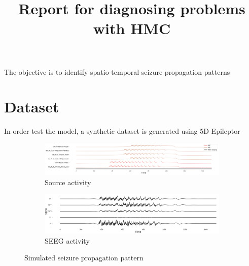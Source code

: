 \documentclass[12pt]{article}
\title{Report for diagnosing problems with HMC}
\begin{document}
\begin{titlepage}
  \maketitle
\end{titlepage}
The objective is to identify spatio-temporal seizure propagation patterns
\section*{Dataset}
In order test the model, a synthetic dataset is generated using 5D Epileptor
\begin{figure}[h!]
  \centering
  \begin{subfigure}{\linewidth}
    \includegraphics[width=\textwidth]{figures/source_activity_syn_data.png}
    \caption{Source activity}
  \end{subfigure}
  \begin{subfigure}{\linewidth}
    \includegraphics[width=\textwidth]{figures/seeg_syn_data.png}
    \caption{SEEG activity}
  \end{subfigure}
  \caption{Simulated seizure propagation pattern}
  \label{fig:syn-data}
\end{figure}
\end{document}

